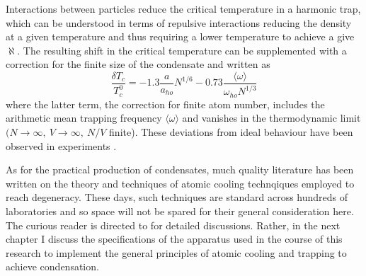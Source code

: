 	Interactions between particles reduce the critical temperature in a harmonic trap, which can be understood in terms of repulsive interactions reducing the density at a given temperature and thus requiring a lower temperature to achieve a give $\aleph$.
	The resulting shift in the critical temperature can be supplemented with a correction for the finite size of the condensate and written as
	\begin{equation}
		\frac{\delta T_c}{T_c^{0}} = -1.3 \frac{a}{a_{ho}} N^{1/6} -0.73\frac{ \langle\omega\rangle}{\omega_{ho} N^{1/3}}
	\end{equation}
	where the latter term, the correction for finite atom number, includes the arithmetic mean trapping frequency $\langle\omega\rangle$ and vanishes in the thermodynamic limit $(N\rightarrow\infty,~V\rightarrow\infty,~N/V$ finite).
	These deviations from ideal behaviour have been observed in experiments \cite{Tammuz11,Smith11}.

	As for the practical production of condensates, much quality literature has been written on the theory and techniques of atomic cooling technqiques employed to reach degeneracy.
	These days, such techniques are standard across hundreds of laboratories and so space will not be spared for their general consideration here.
	The curious reader is directed to \cite{MakingProbingUnderstanding,Courteille01,MetVdS, TychkovThesis} for detailed discussions.
	Rather, in the next chapter I discuss the specifications of the apparatus used in the course of this research to implement the general principles of atomic cooling and trapping to achieve condensation.
	
	




